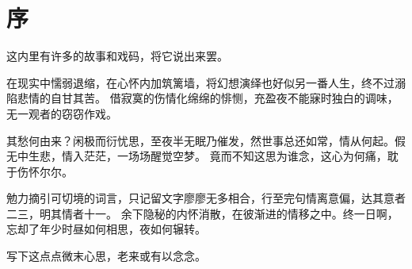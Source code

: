 \part{序}

\vspace*{2\ccwd}

\hspace*{2em} 这内里有许多的故事和戏码，将它说出来罢。

\vspace*{\ccwd}

\hspace*{2em} 在现实中懦弱退缩，在心怀内加筑篱墙，将幻想演绎也好似另一番人生，终不过溺陷悲情的自甘其苦。
借寂寞的伤情化绵绵的悱恻，充盈夜不能寐时独白的调味，无一观者的窃窃作戏。

\vspace*{\ccwd}

\hspace*{2em} 其愁何由来？闲极而衍忧思，至夜半无眠乃催发，然世事总还如常，情从何起。假无中生悲，情入茫茫，一场场醒觉空梦。
竟而不知这思为谁念，这心为何痛，耽于伤怀尔尔。

\vspace*{\ccwd}

\hspace*{2em} 勉力摘引可切境的词言，只记留文字廖廖无多相合，行至完句情离意偏，达其意者二三，明其情者十一。
余下隐秘的内怀消散，在彼渐进的情移之中。终一日啊，忘却了年少时昼如何相思，夜如何辗转。

\vspace*{\ccwd}

\hspace*{2em} 写下这点点微末心思，老来或有以念念。

\newpage